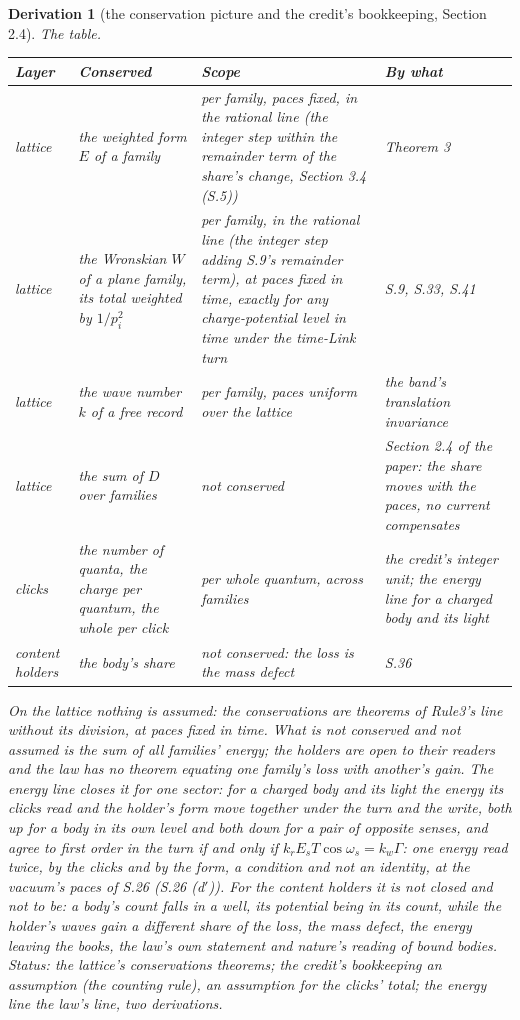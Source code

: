 \documentclass[pdflatex,sn-mathphys-num]{sn-jnl}
\theoremstyle{thmstyleone}
\newtheorem{derivation}{Derivation}
\begin{document}
\begin{derivation}[the conservation picture and the credit's bookkeeping, Section 2.4]
\emph{The table.}
\begin{center}\small\begin{tabular}{p{1.5cm}p{2.8cm}p{3.3cm}p{3.7cm}}
\hline
Layer & Conserved & Scope & By what\\
\hline
lattice & the weighted form $E$ of a family & per family, paces fixed, in the rational line (the integer step within the remainder term of the share's change, Section 3.4 (S.5)) & Theorem 3\\
lattice & the Wronskian $W$ of a plane family, its total weighted by $1 / p_i^2$ & per family, in the rational line (the integer step adding S.9's remainder term), at paces fixed in time, exactly for any charge-potential level in time under the time-Link turn & S.9, S.33, S.41\\
lattice & the wave number $k$ of a free record & per family, paces uniform over the lattice & the band's translation invariance\\
lattice & the sum of $D$ over families & not conserved & Section 2.4 of the paper: the share moves with the paces, no current compensates\\
clicks & the number of quanta, the charge per quantum, the whole per click & per whole quantum, across families & the credit's integer unit; the energy line for a charged body and its light\\
content holders & the body's share & not conserved: the loss is the mass defect & S.36\\
\hline
\end{tabular}\end{center}
On the lattice nothing is assumed: the conservations are theorems of Rule3's line without its division, at paces fixed in time. What is not conserved and not assumed is the sum of all families' energy; the holders are open to their readers and the law has no theorem equating one family's loss with another's gain. The energy line closes it for one sector: for a charged body and its light the energy its clicks read and the holder's form move together under the turn and the write, both up for a body in its own level and both down for a pair of opposite senses, and agree to first order in the turn if and only if $k_r E_s T\cos\omega_s = k_w\Gamma$: one energy read twice, by the clicks and by the form, a condition and not an identity, at the vacuum's paces of S.26 (S.26 (d$'$)). For the content holders it is not closed and not to be: a body's count falls in a well, its potential being in its count, while the holder's waves gain a different share of the loss, the mass defect, the energy leaving the books, the law's own statement and nature's reading of bound bodies. \emph{Status:} the lattice's conservations theorems; the credit's bookkeeping an assumption (the counting rule), an assumption for the clicks' total; the energy line the law's line, two derivations.
\end{derivation}
\end{document}
